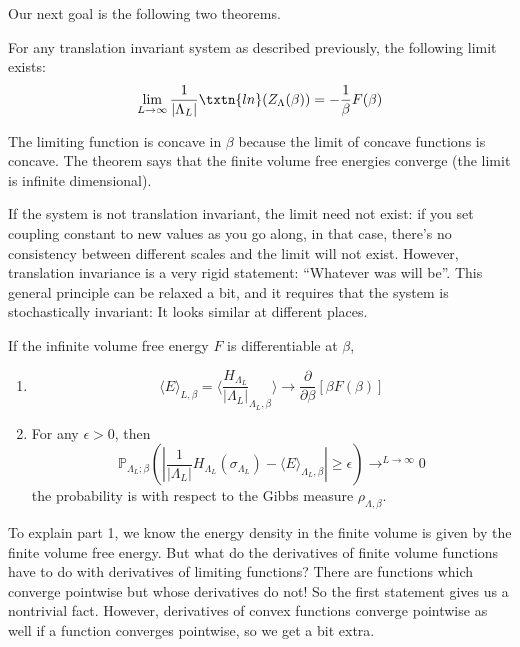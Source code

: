 Our next goal is the following two theorems.

\begin{thm} 
For any translation invariant system as described previously, the following limit exists: 
\[
\lim_{L \to \infty} \frac{1}{|\Lambda_L|} \txtn{ln}(Z_{\Lambda}(\beta)) = -\frac{1}{\beta}F(\beta)
\]
\end{thm}
The limiting function is concave in $\beta$ because the limit of concave functions is concave. 
The theorem says that the finite volume free energies converge (the limit is infinite dimensional). 

If the system is not translation invariant, the limit need not exist: if you set coupling constant to new values as you go along, in that case, there's no consistency between different scales and the limit will not exist. However, translation invariance is a very rigid statement: ``Whatever was will be''. This general principle can be relaxed a bit, and it requires that the system is stochastically invariant: It looks similar at different places. 


\begin{thm}
If the infinite volume free energy $F$ is differentiable at $\beta$,
\begin{enumerate}

\item 
\[
\langle E \rangle_{L, \beta} = \langle \frac{H_{\Lambda_L}}{|\Lambda_L|}_{\Lambda_L, \beta} \rangle \to \frac{\partial}{\partial \beta} \left[\beta F(\beta)\right]
\]


\item For any $\epsilon > 0$, then 
\[
\mathbb{P}_{\Lambda_L; \beta}\left(\left|\frac{1}{|\Lambda_L|}H_{\Lambda_L}(\sigma_{\Lambda_L}) - \langle E \rangle_{\Lambda_L, \beta} \right| \geq \epsilon \right) \to^{L \to \infty} 0
\]
the probability is with respect to the Gibbs measure $\rho_{\Lambda, \beta}$. 

\end{enumerate}
\end{thm}
To explain part 1, we know the energy density in the finite volume is given by the finite volume free energy. But what do the derivatives of finite volume functions have to do with derivatives of limiting functions? There are functions which converge pointwise but whose derivatives do not! So the first statement gives us a nontrivial fact. However, derivatives of convex functions converge pointwise as well if a function converges pointwise, so we get a bit extra. 

